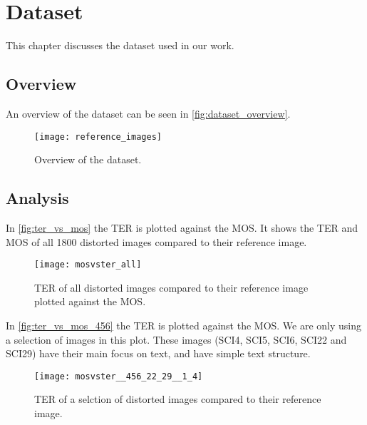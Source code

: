 \chapter{Dataset}
\label{ch:dataset}
This chapter discusses the dataset used in our work.

\section{Overview}
An overview of the dataset can be seen in \autoref{fig:dataset_overview}.

\begin{figure}[h]
    \centering
    \texttt{[image: reference\_images]}
    \caption{Overview of the dataset.}
    \label{fig:dataset_overview}
\end{figure}


\section{Analysis}

In \autoref{fig:ter_vs_mos} the TER is plotted against the MOS.
It shows the TER and MOS of all 1800 distorted images compared to their reference image.

\begin{figure}[h]
    \centering
    \texttt{[image: mosvster\_all]}
    \caption{TER of all distorted images compared to their reference image plotted against the MOS.}
    \label{fig:ter_vs_mos}
\end{figure}

In \autoref{fig:ter_vs_mos_456} the TER is plotted against the MOS.
We are only using a selection of images in this plot.
These images (SCI4, SCI5, SCI6, SCI22 and SCI29) have their main focus on text, and have simple text structure.
\begin{figure}[h]
    \centering
    \texttt{[image: mosvster\_\_456\_22\_29\_\_1\_4]}
    \caption{TER of a selction of distorted images compared to their reference image.}
    \label{fig:ter_vs_mos_456}
\end{figure}
